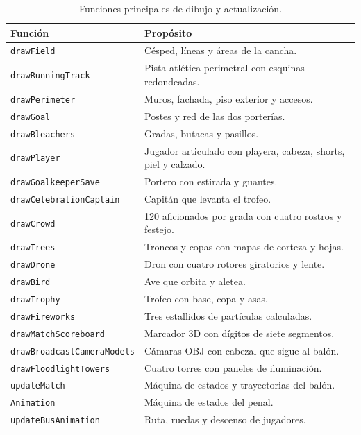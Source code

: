 \documentclass[12pt,letterpaper]{article}
\begin{document}
\begin{table}[H]
\centering
\small
\begin{tabular}{p{}p{}}
\toprule
\textbf{Función} & \textbf{Propósito}\\
\midrule
\texttt{drawField} & Césped, líneas y áreas de la cancha.\\
\texttt{drawRunningTrack} & Pista atlética perimetral con esquinas redondeadas.\\
\texttt{drawPerimeter} & Muros, fachada, piso exterior y accesos.\\
\texttt{drawGoal} & Postes y red de las dos porterías.\\
\texttt{drawBleachers} & Gradas, butacas y pasillos.\\
\texttt{drawPlayer} & Jugador articulado con playera, cabeza, shorts, piel y calzado.\\
\texttt{drawGoalkeeperSave} & Portero con estirada y guantes.\\
\texttt{drawCelebrationCaptain} & Capitán que levanta el trofeo.\\
\texttt{drawCrowd} & 120 aficionados por grada con cuatro rostros y festejo.\\
\texttt{drawTrees} & Troncos y copas con mapas de corteza y hojas.\\
\texttt{drawDrone} & Dron con cuatro rotores giratorios y lente.\\
\texttt{drawBird} & Ave que orbita y aletea.\\
\texttt{drawTrophy} & Trofeo con base, copa y asas.\\
\texttt{drawFireworks} & Tres estallidos de partículas calculadas.\\
\texttt{drawMatchScoreboard} & Marcador 3D con dígitos de siete segmentos.\\
\texttt{drawBroadcastCameraModels} & Cámaras OBJ con cabezal que sigue al balón.\\
\texttt{drawFloodlightTowers} & Cuatro torres con paneles de iluminación.\\
\texttt{updateMatch} & Máquina de estados y trayectorias del balón.\\
\texttt{Animation} & Máquina de estados del penal.\\
\texttt{updateBusAnimation} & Ruta, ruedas y descenso de jugadores.\\
\bottomrule
\end{tabular}
\caption{Funciones principales de dibujo y actualización.}\label{tab:funciones}
\end{table}
\end{document}
